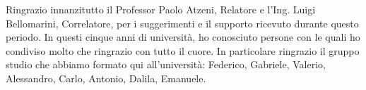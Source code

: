 Ringrazio innanzitutto il Professor Paolo Atzeni, Relatore e l'Ing. Luigi Bellomarini, Correlatore, per i suggerimenti e il supporto ricevuto durante questo periodo. \newline \newline
In questi cinque anni di università, ho conosciuto persone con le quali ho condiviso molto che ringrazio con tutto il cuore. \newline \newline
In particolare ringrazio il gruppo studio che abbiamo formato qui all'università: Federico, Gabriele, Valerio, Alessandro, Carlo, Antonio, Dalila, Emanuele.